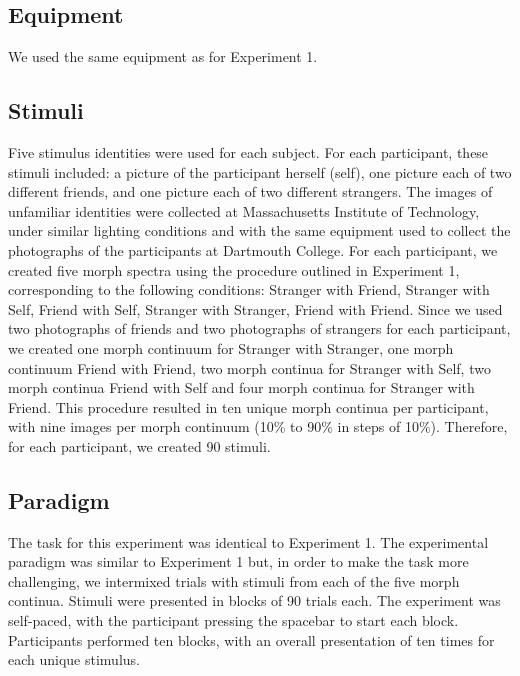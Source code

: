 \documentclass[10pt,letterpaper]{article}
\begin{document}
\subsection*{Equipment}
We used the same equipment as for Experiment 1. 

\subsection*{Stimuli}
Five stimulus identities were used for each subject. For each participant, these stimuli included: a picture of the participant herself (self), one picture each of two different friends, and one picture each of two different strangers. The images of unfamiliar identities were collected at Massachusetts Institute of Technology, under similar lighting conditions and with the same equipment used to collect the photographs of the participants at Dartmouth College. For each participant, we created five morph spectra using the procedure outlined in Experiment 1, corresponding to the following conditions: Stranger with Friend,  Stranger with Self, Friend with Self, Stranger with Stranger, Friend with Friend. Since we used two photographs of friends and two photographs of strangers for each participant, we created one morph continuum for Stranger with Stranger, one morph continuum Friend with Friend, two morph continua for Stranger with Self, two morph continua Friend with Self and four morph continua for Stranger with Friend. This procedure resulted in ten unique morph continua per participant, with nine images per morph continuum (10\% to 90\% in steps of 10\%). Therefore, for each participant, we created 90 stimuli. 

\subsection*{Paradigm}
The task for this experiment was identical to Experiment 1. The experimental paradigm was similar to Experiment 1 but, in order to make the task more challenging, we intermixed trials with stimuli from each of the five morph continua. Stimuli were presented in blocks of 90 trials each. The experiment was self-paced, with the participant pressing the spacebar to start each block. Participants performed ten blocks, with an overall presentation of ten times for each unique stimulus.
\end{document}
